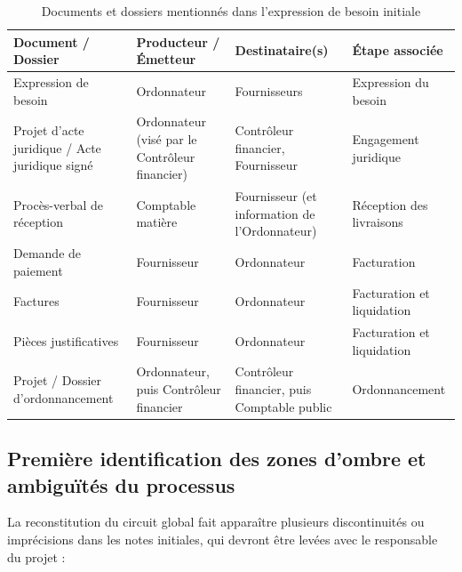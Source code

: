 \begin{table}[H]
\centering
\small
\caption{Documents et dossiers mentionnés dans l'expression de besoin initiale}
\label{tab:documents}
\begin{tabularx}{\linewidth}{L{4.2cm} L{3.3cm} L{3.3cm} Y}
\toprule
\textbf{\sffamily Document / Dossier} & \textbf{\sffamily Producteur / Émetteur} & \textbf{\sffamily Destinataire(s)} & \textbf{\sffamily Étape associée} \\
\midrule
Expression de besoin & Ordonnateur & Fournisseurs & Expression du besoin \\
Projet d'acte juridique / Acte juridique signé & Ordonnateur (visé par le Contrôleur financier) & Contrôleur financier, Fournisseur & Engagement juridique \\
Procès-verbal de réception & Comptable matière & Fournisseur (et information de l'Ordonnateur) & Réception des livraisons \\
Demande de paiement & Fournisseur & Ordonnateur & Facturation \\
Factures & Fournisseur & Ordonnateur & Facturation et liquidation \\
Pièces justificatives & Fournisseur & Ordonnateur & Facturation et liquidation \\
Projet / Dossier d'ordonnancement & Ordonnateur, puis Contrôleur financier & Contrôleur financier, puis Comptable public & Ordonnancement \\
\bottomrule
\end{tabularx}
\end{table}

\subsection{Première identification des zones d'ombre et ambiguïtés du processus}

La reconstitution du circuit global fait apparaître plusieurs discontinuités ou imprécisions dans les notes initiales, qui devront être levées avec le responsable du projet :

